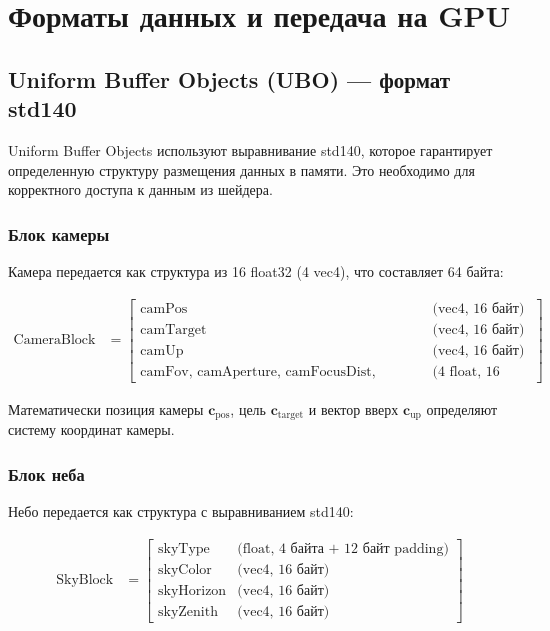 \documentclass[14pt, a4paper]{extarticle}
\begin{document}
\section{Форматы данных и передача на GPU}

\subsection{Uniform Buffer Objects (UBO) --- формат std140}

Uniform Buffer Objects используют выравнивание std140, которое гарантирует определенную структуру размещения данных в памяти. Это необходимо для корректного доступа к данным из шейдера.

\subsubsection{Блок камеры}

Камера передается как структура из 16 float32 (4 vec4), что составляет 64 байта:

\begin{align}
\text{CameraBlock} &= \begin{bmatrix}
\text{camPos} & \text{(vec4, 16 байт)} \\
\text{camTarget} & \text{(vec4, 16 байт)} \\
\text{camUp} & \text{(vec4, 16 байт)} \\
\text{camFov, camAperture, camFocusDist, camAspect} & \text{(4 float, 16 байт)}
\end{bmatrix}
\end{align}

Математически позиция камеры $\mathbf{c}_{\text{pos}}$, цель $\mathbf{c}_{\text{target}}$ и вектор вверх $\mathbf{c}_{\text{up}}$ определяют систему координат камеры.

\subsubsection{Блок неба}

Небо передается как структура с выравниванием std140:

\begin{align}
\text{SkyBlock} &= \begin{bmatrix}
\text{skyType} & \text{(float, 4 байта + 12 байт padding)} \\
\text{skyColor} & \text{(vec4, 16 байт)} \\
\text{skyHorizon} & \text{(vec4, 16 байт)} \\
\text{skyZenith} & \text{(vec4, 16 байт)}
\end{bmatrix}
\end{align}
\end{document}
